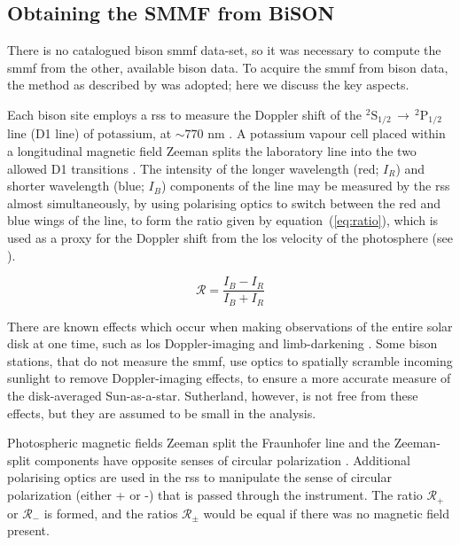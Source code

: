 \subsection{Obtaining the SMMF from BiSON}

There is no catalogued \gls{bison} \gls{smmf} data-set, so it was necessary to compute the \gls{smmf} from the other, available \gls{bison} data. To acquire the \gls{smmf} from \gls{bison} data, the method as described by \citet{chaplin_studies_2003} was adopted; here we discuss the key aspects.

Each  \gls{bison} site employs a \gls{rss} to measure the Doppler shift of the $^{2}\mathrm{S}_{1/2} \, \rightarrow \, ^{2}\mathrm{P}_{1/2}$ line (D1 line) of potassium, at $\sim 770$ nm \citep{brookes_resonant-scattering_1978}. A potassium vapour cell placed within a longitudinal magnetic field Zeeman splits the laboratory line into the two allowed D1 transitions \citep{lund_spatial_2017}. The intensity of the longer wavelength (red; $I_R$) and shorter wavelength (blue; $I_B$) components of the line may be measured by the \gls{rss} almost simultaneously, by using polarising optics to switch between the red and blue wings of the line, to form the ratio given by equation~(\ref{eq:ratio}), which is used as a proxy for the Doppler shift from the \gls{los} velocity of the photosphere (see \citet{brookes_observation_1976, brookes_resonant-scattering_1978, elsworth_performance_1995, chaplin_studies_2003, lund_spatial_2017}).  

\begin{equation}
\mathcal{R} = \frac{I_B - I_R}{I_B + I_R}
\label{eq:ratio}
\end{equation}

There are known effects which occur when making observations of the entire solar disk at one time, such as \gls{los} Doppler-imaging and limb-darkening \citep{davies_bison_2014}. Some \gls{bison} stations, that do not measure the \gls{smmf}, use optics to spatially scramble incoming sunlight to remove Doppler-imaging effects, to ensure a more accurate measure of the disk-averaged Sun-as-a-star. Sutherland, however, is not free from these effects, but they are assumed to be small in the analysis.

Photospheric magnetic fields Zeeman split the Fraunhofer line and the Zeeman-split components have opposite senses of circular polarization \citep{chaplin_studies_2003}. Additional polarising optics are used in the \gls{rss} to manipulate the sense of circular polarization (either + or -) that is passed through the instrument. The ratio $\mathcal{R}_{+}$ or $\mathcal{R}_{-}$ is formed, and the ratios $\mathcal{R}_{\pm}$ would be equal if there was no magnetic field present.

